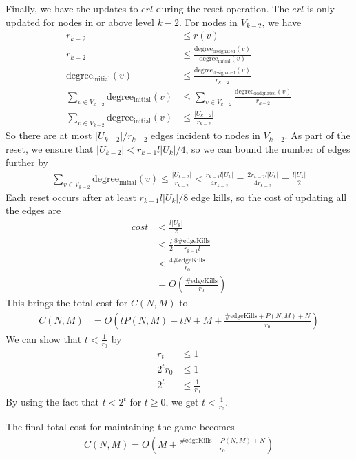 Finally, we have the updates to $erl$ during the reset operation. The $erl$ is only updated for nodes in or above level $k-2$.
For nodes in $V_{k-2}$, we have
\begin{align*}
r_{k-2} &\leq r(v)\\
r_{k-2} &\leq \frac{\mathrm{degree_{designated}}(v)}{\mathrm{degree_{initial}}(v)}\\
\mathrm{degree_{initial}}(v) &\leq  \frac{\mathrm{degree_{designated}}(v)}{r_{k-2}}\\
\sum\limits_{v\in V_{k-2}}{\mathrm{degree_{initial}}(v)} &\leq  \sum\limits_{v\in V_{k-2}}{\frac{\mathrm{degree_{designated}}(v)}{r_{k-2}}}\\
\sum\limits_{v\in V_{k-2}}{\mathrm{degree_{initial}}(v)} &\leq  \frac{|U_{k-2}|}{r_{k-2}}
\end{align*}
So there are at most $|U_{k-2}|/r_{k-2}$ edges incident to nodes in $V_{k-2}$.
As part of the reset, we ensure that $|U_{k-2}|<r_{k-1}l|U_k|/4$, so we can bound the number of edges further by
\begin{align*}
\sum\limits_{v\in V_{k-2}}{\mathrm{degree_{initial}}(v)} \leq \frac{|U_{k-2}|}{r_{k-2}} < \frac{r_{k-1}l|U_k|}{4r_{k-2}} = \frac{2r_{k-2}l|U_k|}{4r_{k-2}} = \frac{l|U_k|}{2}
\end{align*}
Each reset occurs after at least $r_{k-1}l|U_k|/8$ edge kills, so the cost of updating all the edges are
\begin{align*}
cost &< \frac{l|U_k|}{2} \\
&< \frac{l}{2}\frac{8\mathrm{\#edgeKills}}{r_{k-1}l}  \\
&< \frac{4\mathrm{\#edgeKills}}{r_0} \\
&=O\left( \frac{\mathrm{\#edgeKills}}{r_0} \right)
\end{align*}
This brings the total cost for $C(N, M)$ to
\begin{align*}
C(N, M)&=O\left(tP(N, M)+tN + M + \frac{\mathrm{\#edgeKills} + P(N, M) + N}{r_0}\right)
\end{align*}
We can show that $t < \frac{1}{r_0}$ by
\begin{align*}
r_t &\leq 1\\
2^tr_0 &\leq 1\\
2^t &\leq \frac{1}{r_0}
\end{align*}
By using the fact that $t < 2^t$ for $t \geq 0$, we get $t < \frac{1}{r_0}$.

The final total cost for maintaining the game becomes 
\begin{align*}
C(N, M)=O\left(M + \frac{\mathrm{\#edgeKills} + P(N, M) + N}{r_0}\right)
\end{align*}

